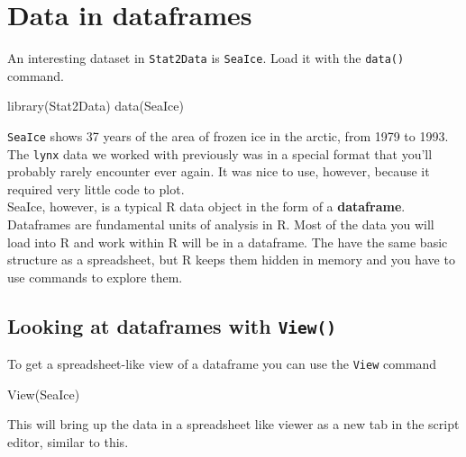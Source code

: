 \documentclass[
]{book}
\newenvironment{Shaded}{\begin{snugshade}}{\end{snugshade}}
\newcommand{\FunctionTok}[1]{\textcolor[rgb]{0.00,0.00,0.00}{#1}}
\newcommand{\NormalTok}[1]{#1}
\begin{document}
\hypertarget{data-in-dataframes}{%
\chapter{Data in dataframes}\label{data-in-dataframes}}

An interesting dataset in \texttt{Stat2Data} is \texttt{SeaIce}. Load it with the \texttt{data()} command.

\begin{Shaded}
\begin{Highlighting}[]
\FunctionTok{library}\NormalTok{(Stat2Data)}
\FunctionTok{data}\NormalTok{(SeaIce)}
\end{Highlighting}
\end{Shaded}

\texttt{SeaIce} shows 37 years of the area of frozen ice in the arctic, from 1979 to 1993. The \texttt{lynx} data we worked with previously was in a special format that you'll probably rarely encounter ever again. It was nice to use, however, because it required very little code to plot.\\
SeaIce, however, is a typical R data object in the form of a \textbf{dataframe}. Dataframes are fundamental units of analysis in R. Most of the data you will load into R and work within R will be in a dataframe. The have the same basic structure as a spreadsheet, but R keeps them hidden in memory and you have to use commands to explore them.

\hypertarget{looking-at-dataframes-with-view}{%
\section{\texorpdfstring{Looking at dataframes with \texttt{View()}}{Looking at dataframes with View()}}\label{looking-at-dataframes-with-view}}

To get a spreadsheet-like view of a dataframe you can use the \texttt{View} command

\begin{Shaded}
\begin{Highlighting}[]
\FunctionTok{View}\NormalTok{(SeaIce)}
\end{Highlighting}
\end{Shaded}

This will bring up the data in a spreadsheet like viewer as a new tab in the script editor, similar to this.
\end{document}
